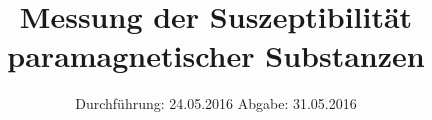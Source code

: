 

\subject{V704}
\title{Messung der Suszeptibilität paramagnetischer Substanzen}
\date{
  Durchführung: 24.05.2016
  \hspace{3em}
  Abgabe: 31.05.2016
}



\maketitle
\thispagestyle{empty}
\tableofcontents
\newpage







\printbibliography


